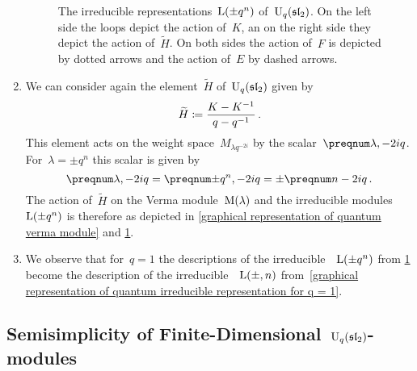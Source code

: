 \documentclass[a4paper, 11pt, oneside]{scrartcl}
\begin{document}
\begin{remark}
\begin{enumerate}
\begin{figure}[t]
\begin{center}
        \end{center}
        \caption{
          The irreducible representations~$\operatorname{L}(\pm q^n)$ of~$\operatorname{U}_q(\mathfrak{sl}_2)$.
          On the left side the loops depict the action of~$K$, an on the right side they depict the action of~$\widetilde{H}$.
          On both sides the action of~$F$ is depicted by dotted arrows and the action of~$E$ by dashed arrows.
        }
        \label{graphical representation of irreducible quantum representation}
      \end{figure}
    \item
      We can consider again the element~$\widetilde{H}$ of~$\operatorname{U}_q(\mathfrak{sl}_2)$ given by
      \[
        \widetilde{H}
        \coloneqq
        \frac{K - K^{-1}}{q - q^{-1}} \,.
      \]
      This element acts on the weight space~$M_{\lambda q^{-2i}}$ by the scalar~$\qnum{\lambda, -2i}$.
      For~$\lambda = \pm q^n$ this scalar is given by
      \[
        \qnum{\lambda, -2i}
        =
        \qnum{\pm q^n, -2i}
        =
        \pm \qnum{n - 2i} \,.
      \]
      The action of~$\widetilde{H}$ on the Verma module~$\operatorname{M}(\lambda)$ and the irreducible modules~$\operatorname{L}(\pm q^n)$ is therefore as depicted in \cref{graphical representation of quantum verma module} and \cref{graphical representation of irreducible quantum representation}.
    \item
      We observe that for~$q = 1$ the descriptions of the irreducible~~$\operatorname{L}(\pm q^n)$ from \cref{graphical representation of irreducible quantum representation} become the description of the irreducible~~$\operatorname{L}(\pm, n)$ from~\cref{graphical representation of quantum irreducible representation for q = 1}.
  \end{enumerate}
\end{remark}



\subsection{Semisimplicity of Finite-Dimensional~\texorpdfstring{$\operatorname{U}_q(\mathfrak{sl}_2)$}{Uq(sl2)}-modules}
\end{document}
